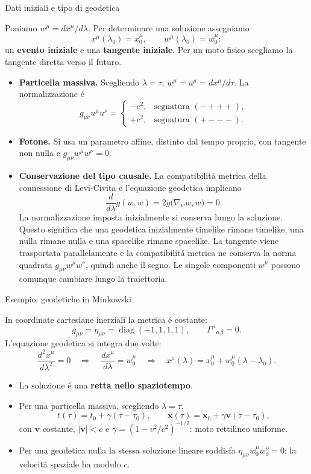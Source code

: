 \begin{frame}[t]{Dati iniziali e tipo di geodetica}
\small\raggedright
Poniamo $w^\mu=dx^\mu/d\lambda$. Per determinare una soluzione assegniamo
\[
\boxed{x^\mu(\lambda_0)=x_0^\mu,\qquad
w^\mu(\lambda_0)=w_0^\mu:}
\]
un \textbf{evento iniziale} e una \textbf{tangente iniziale}.
Per un moto fisico scegliamo la tangente diretta verso il futuro.
\begin{itemize}
\item \textbf{Particella massiva.} Scegliendo $\lambda=\tau$,
$w^\mu=u^\mu=dx^\mu/d\tau$. La normalizzazione \'e
\[
g_{\mu\nu}u^\mu u^\nu=
\begin{cases}
-c^2,&\text{segnatura }(-+++),\\
+c^2,&\text{segnatura }(+---).
\end{cases}
\]
\item \textbf{Fotone.} Si usa un parametro affine, distinto dal tempo proprio,
con tangente non nulla e $g_{\mu\nu}w^\mu w^\nu=0$.
\item \textbf{Conservazione del tipo causale.} La compatibilit\'a metrica
della connessione di Levi-Civita e l'equazione geodetica implicano
\[
\frac{d}{d\lambda}g(w,w)
=2g\bigl(\nabla_w w,w\bigr)=0.
\]
La normalizzazione imposta inizialmente si conserva lungo la soluzione.
Questo significa che una geodetica inizialmente timelike rimane
timelike, una nulla rimane nulla e una spacelike rimane spacelike.
La tangente viene trasportata parallelamente e la compatibilit\'a
metrica ne conserva la norma quadrata
$g_{\mu\nu}w^\mu w^\nu$, quindi anche il segno.
Le singole componenti $w^\mu$ possono comunque cambiare lungo
la traiettoria.
\end{itemize}
\end{frame}

\begin{frame}[t]{Esempio: geodetiche in Minkowski}
\small\raggedright
In coordinate cartesiane inerziali la metrica \'e costante:
\[
g_{\mu\nu}=\eta_{\mu\nu}=\operatorname{diag}(-1,1,1,1),
\qquad \Gamma^\mu{}_{\alpha\beta}=0.
\]
L'equazione geodetica si integra due volte:
\[
\frac{d^2x^\mu}{d\lambda^2}=0
\quad\Longrightarrow\quad
\frac{dx^\mu}{d\lambda}=w_0^\mu
\quad\Longrightarrow\quad
\boxed{x^\mu(\lambda)=x_0^\mu+w_0^\mu(\lambda-\lambda_0).}
\]
\begin{itemize}
\item La soluzione \'e una \textbf{retta nello spaziotempo}.
\item Per una particella massiva, scegliendo $\lambda=\tau$,
\[
t(\tau)=t_0+\gamma(\tau-\tau_0),\qquad
\mathbf{x}(\tau)=\mathbf{x}_0+\gamma\mathbf{v}(\tau-\tau_0),
\]
con $\mathbf v$ costante, $|\mathbf v|<c$ e
$\gamma=(1-v^2/c^2)^{-1/2}$: moto rettilineo uniforme.
\item Per una geodetica nulla la stessa soluzione lineare soddisfa
$\eta_{\mu\nu}w_0^\mu w_0^\nu=0$; la velocit\'a spaziale ha modulo $c$.
\end{itemize}
\end{frame}

